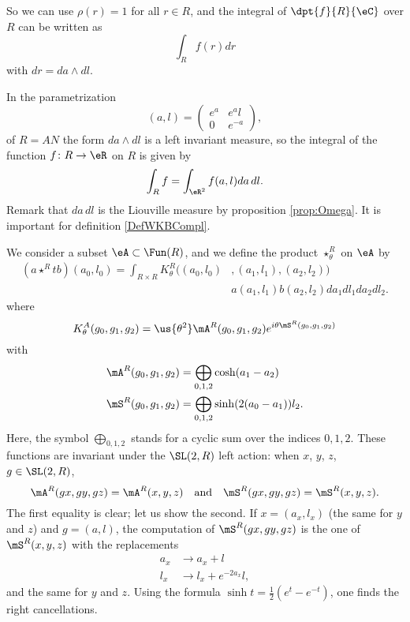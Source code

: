 So we can use $\rho(r)=1$ for all $r\in R$, and the integral of $\dpt{f}{R}{\eC}$ over $R$ can be written as
\[
\int_Rf(r)dr
\]
with $dr=da\wedge dl$.

In the parametrization 
\[ 
  (a,l)=\begin{pmatrix}
 e^{a}		&  e^{a}l\\
0		&	 e^{-a}
\end{pmatrix},
\]
of $R=AN$ the form $da\wedge dl$ is a left invariant measure, so the integral of the function $f\colon R\to \eR$ on $R$ is given by
\[ 
  \int_R f=\int_{\eR^2} f(a,l)da\,dl.
\]
Remark that $da\,dl$ is the Liouville measure by proposition \ref{prop:Omega}. It is important for definition \ref{DefWKBCompl}.

We consider a subset $\eA\subset\Fun(R)$, and we define the product $\star^{R}_{\theta}$ on $\eA$ by
\begin{equation}\label{eq:star_R}
\begin{split}
(a\star^{R}t b)(a_0,l_0)
=\int_{R\times R}K^R_{\theta}\big((a_0,l_0)&,(a_1,l_1),(a_2,l_2)\big)\\
                                           &a(a_1,l_1)b(a_2,l_2)da_1dl_1da_2dl_2.
\end{split}
\end{equation}
where
\[
K_{\theta}^A(g_0,g_1,g_2)=\us{\theta^2}\mA^R(g_0,g_1,g_2)e^{i\theta \mS^R(g_0,g_1,g_2)}
\]
 with
\begin{subequations}
\begin{align}
  \mA^R(g_0,g_1,g_2)&=\bigoplus_{0,1,2}\cosh(a_1-a_2)\\
  \mS^R(g_0,g_1,g_2)&=\bigoplus_{0,1,2}\sinh(2(a_0-a_1))l_2.
\end{align}
\end{subequations}
Here, the symbol $\bigoplus_{0,1,2}$ stands for a cyclic sum over the indices $0,1,2$.
These functions are invariant under the $\SL(2,R)$ left action: when $x$, $y$, $z$, $g\in\SL(2,R)$,
\begin{equation}
 \mA^R(gx,gy,gz)=\mA^R(x,y,z)\quad\text{and}\quad \mS^R(gx,gy,gz)=\mS^R(x,y,z).
\end{equation}
 The first equality is clear; let us show the second. If $x=(a_x,l_x)$ (the same for $y$ and $z$) and $g=(a,l)$, the computation of $\mS^R(gx,gy,gz)$ is the one of $\mS^R(x,y,z)$ with the replacements
\begin{subequations}
\begin{align}
a_x&\rightarrow a_x+l\\
l_x&\rightarrow l_x+e^{-2a_x}l,
\end{align}
\end{subequations}
and the same for $y$ and $z$. Using the formula $\sinh t=\frac{1}{2}(e^{t}-e^{-t})$, one finds the right cancellations.

